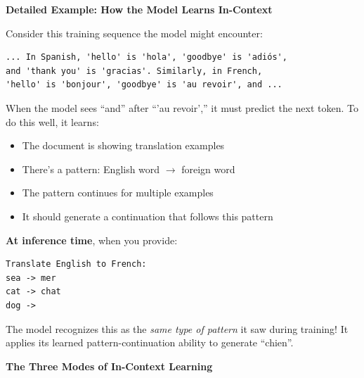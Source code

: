 \documentclass{article}
\begin{document}
\textbf{Detailed Example: How the Model Learns In-Context}

Consider this training sequence the model might encounter:

\begin{verbatim}
... In Spanish, 'hello' is 'hola', 'goodbye' is 'adiós',
and 'thank you' is 'gracias'. Similarly, in French,
'hello' is 'bonjour', 'goodbye' is 'au revoir', and ...
\end{verbatim}

When the model sees ``and'' after ``'au revoir','' it must predict the next token. To do this well, it learns:
\begin{itemize}
\item The document is showing translation examples
\item There's a pattern: English word $\rightarrow$ foreign word
\item The pattern continues for multiple examples
\item It should generate a continuation that follows this pattern
\end{itemize}

\textbf{At inference time}, when you provide:

\begin{verbatim}
Translate English to French:
sea -> mer
cat -> chat
dog ->
\end{verbatim}

The model recognizes this as the \textit{same type of pattern} it saw during training! It applies its learned pattern-continuation ability to generate ``chien''.

\textbf{The Three Modes of In-Context Learning}
\end{document}

